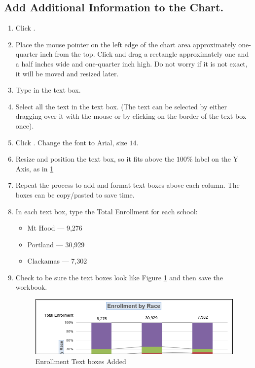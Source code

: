 \subsection{Add Additional Information to the Chart.}

\begin{enumerate}
	\item Click .
	\item Place the mouse pointer on the left edge of the chart area approximately one-quarter inch from the top. Click and drag a rectangle approximately one and a half inches wide and one-quarter inch high. Do not worry if it is not exact, it will be moved and resized later.
	\item Type  in the text box.
	\item Select all the text in the text box. (The text can be selected by either dragging over it with the mouse or by clicking on the border of the text box once). 
	\item Click . Change the font to Arial, size $ 14 $.
	\item Resize and position the text box, so it fits above the $ 100\% $ label on the Y Axis, as in \ref{04:fig43}
	\item Repeat the process to add and format text boxes above each column. The boxes can be copy/pasted to save time.
	\item In each text box, type the Total Enrollment for each school:

	\begin{itemize}
		\item Mt Hood --- 9,276
		\item Portland --- 30,929
		\item Clackamas --- 7,302
	\end{itemize}
	\item Check to be sure the text boxes look like Figure \ref{04:fig43} and then save the  workbook.

	\begin{figure}[H]
		\centering
		\includegraphics[width=\maxwidth{.95\linewidth}]{gfx/ch04_fig43}
		\caption{Enrollment Text boxes Added}
		\label{04:fig43}
	\end{figure}


\end{enumerate}
